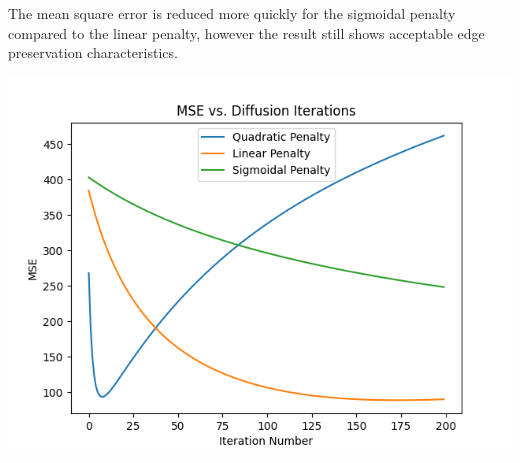 \documentclass{article}
\begin{document}
  \noindent The mean square error is reduced more quickly for the sigmoidal penalty
  compared to the linear penalty, however the result still shows acceptable
  edge preservation characteristics.
  \begin{center}
    \includegraphics[scale=.5]{../generated_images/MSE_test1.png}\\
  \end{center}
\end{document}
